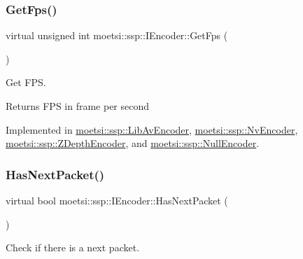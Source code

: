 \subsubsection{\texorpdfstring{Get\+Fps()}{GetFps()}\hspace{0.1cm}{\footnotesize\ttfamily [2/2]}}
{\footnotesize\ttfamily virtual unsigned int moetsi\+::ssp\+::\+I\+Encoder\+::\+Get\+Fps (\begin{DoxyParamCaption}{ }\end{DoxyParamCaption})\hspace{0.3cm}{\ttfamily [pure virtual]}}



Get F\+PS. 

\begin{DoxyReturn}{Returns}
F\+PS in frame per second 
\end{DoxyReturn}


Implemented in \hyperlink{classmoetsi_1_1ssp_1_1LibAvEncoder_ae21f81cb967359132183a29e04307933}{moetsi\+::ssp\+::\+Lib\+Av\+Encoder}, \hyperlink{classmoetsi_1_1ssp_1_1NvEncoder_ab94b826f2aef05afad376132743001d9}{moetsi\+::ssp\+::\+Nv\+Encoder}, \hyperlink{classmoetsi_1_1ssp_1_1ZDepthEncoder_a9ea0a5783d7d265fccc3a2c262600552}{moetsi\+::ssp\+::\+Z\+Depth\+Encoder}, and \hyperlink{classmoetsi_1_1ssp_1_1NullEncoder_ad6727fa08528622081aa4eca4aacc6c1}{moetsi\+::ssp\+::\+Null\+Encoder}.

\mbox{\label{classmoetsi_1_1ssp_1_1IEncoder_a2af8e23d841ef61f6ee4037e56a3694d}} 
\subsubsection{\texorpdfstring{Has\+Next\+Packet()}{HasNextPacket()}\hspace{0.1cm}{\footnotesize\ttfamily [1/2]}}
{\footnotesize\ttfamily virtual bool moetsi\+::ssp\+::\+I\+Encoder\+::\+Has\+Next\+Packet (\begin{DoxyParamCaption}{ }\end{DoxyParamCaption})\hspace{0.3cm}{\ttfamily [pure virtual]}}



Check if there is a next packet. 

